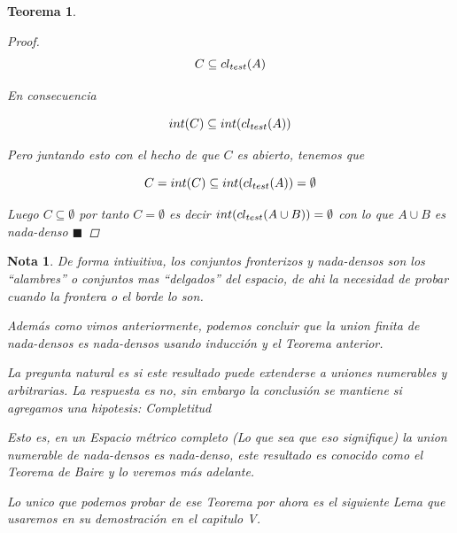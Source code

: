 \documentclass[oneside]{book} %
\theoremstyle{Teorema}
\newtheorem{Teorema}[Definicion]{Teorema}
\newtheorem{Nota}[Definicion]{Nota}
\theoremstyle{Ejemplos}
\theoremstyle{[Obs]}
\def \test {test}
\newcommand{\cerradura}[2][\test]{\ifx \test #1 {\overline{#2}} \else {cl_{#1}(#2)} \fi} %
\renewcommand{\{}{\left\lbrace} %
\renewcommand{\}}{\right\rbrace} %
\renewcommand{\u}{\cup} %
\renewcommand{\sc}{\subseteq} %
\renewcommand{\qed}{$\blacksquare$} %
\begin{document}
\begin{Teorema}
\begin{proof}
					\[ C \sc \cerradura{A} \]
					
					En consecuencia 

					\[ int(C) \sc int(\cerradura{A}) \]

					Pero juntando esto con el hecho de que $C$ es abierto, tenemos que 

					\[ C = int(C) \sc int(\cerradura{A}) = \emptyset \]

					Luego $C \sc \emptyset$ por tanto $C = \emptyset$ es decir $int(\cerradura{A \u B}) = \emptyset$ con lo que $A \u B$ es nada-denso \qed

				\end{proof}

			\end{Teorema}

			\begin{Nota}\setlength{\parindent}{0em}
			
				De forma intiuitiva, los conjuntos fronterizos y nada-densos son los ``alambres'' o conjuntos mas ``delgados'' del espacio, de ahi la necesidad de probar cuando la frontera o el borde lo son.

				Además como vimos anteriormente, podemos concluir que la union finita de nada-densos es nada-densos usando inducción y el Teorema anterior.

				La pregunta natural es si este resultado puede extenderse a uniones numerables y arbitrarias. La respuesta es no, sin embargo la conclusión se mantiene si agregamos una hipotesis: Completitud 

				Esto es, en un Espacio métrico completo (Lo que sea que eso signifique) la union numerable de nada-densos es nada-denso, este resultado es conocido como el Teorema de Baire y lo veremos más adelante.
			
				Lo unico que podemos probar de ese Teorema por ahora es el siguiente Lema que usaremos en su demostración en el capitulo V.
			
			\end{Nota}
\end{document}
